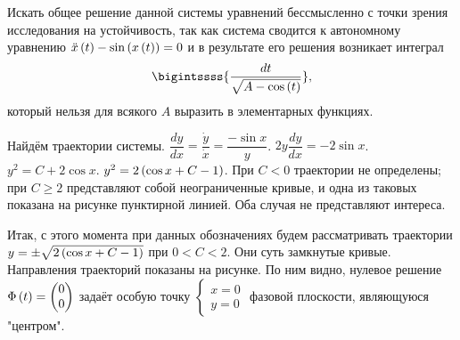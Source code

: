 \documentclass[a5paper,10pt]{article}
\begin{document}
Искать общее решение данной системы уравнений бессмысленно с точки зрения исследования на устойчивость, так как система сводится к автономному уравнению $\ddot{x}\left(t\right) - \sin\left(x\left(t\right)\right) = 0$ и в результате его решения возникает интеграл
$$\bigintssss{\frac {dt} {\sqrt{A - \cos\br{t}}}},$$
который нельзя для всякого $A$ выразить в элементарных функциях.

Найдём траектории системы. $\dfrac {dy} {dx} = \dfrac {\dot{y}} {\dot{x}} = \dfrac {-\sin{x}} {y}$. $2y \dfrac {dy} {dx} = -2\sin{x}$. $y^{2} = C + 2\cos{x}$. $y^2 = 2\left(\cos x + C - 1\right)$. При $C < 0$ траектории не определены; при $C \ge 2$ представляют собой неограниченные кривые, и одна из таковых показана на рисунке пунктирной линией. Оба случая не представляют интереса.

Итак, с этого момента при данных обозначениях будем рассматривать траектории $y = \pm \sqrt{2\left(\cos{x} + C - 1\right)}$ при $0 < C < 2$. Они суть замкнутые кривые. Направления траекторий показаны на рисунке. По ним видно, нулевое решение $\Phi\left(t\right) = \begin{pmatrix} 0 \\ 0 \end{pmatrix}$ задаёт особую точку $\left\{ \begin{matrix} x = 0 \\ y = 0 \end{matrix} \right.$ фазовой плоскости, являющуюся "центром".
\end{document}
